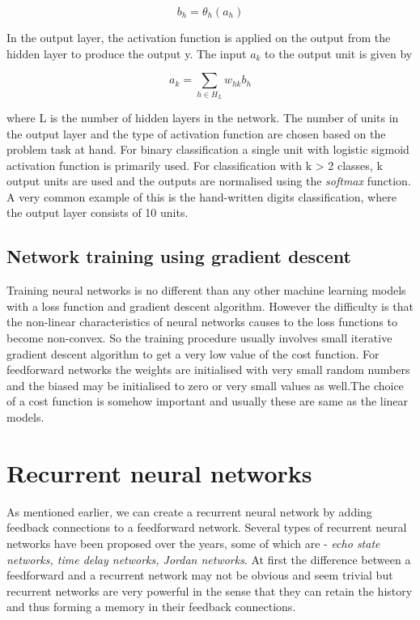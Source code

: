     \begin{equation}
        b_{h} = \theta_{h}(a_{h})
    \end{equation}

In the output layer, the activation function is applied on the output from the hidden layer to
produce the output y. The input $a_{k}$ to the output unit is given by

    \begin{equation}
        a_{k} = \displaystyle\sum_{h \in H_{L}} w_{hk}b_{h}
    \end{equation}

where L is the number of hidden layers in the network. The number of units in the output layer
and the type of activation function are chosen based on the problem task at hand. For binary
classification a single unit with logistic sigmoid activation function is primarily used. For
classification with k > 2 classes, k output units are used and the outputs are normalised using
the \emph{softmax} function. A very common example of this is the hand-written digits classification,
where the output layer consists of 10 units.

\subsection {Network training using gradient descent}
Training neural networks is no different than any other machine learning models with a loss
function and gradient descent algorithm. However the difficulty is that the non-linear
characteristics of neural networks causes to the loss functions to become non-convex. So the
training procedure usually involves small iterative gradient descent algorithm to get a very low
value of the cost function. For feedforward networks the weights are initialised with very small
random numbers and the biased may be initialised to zero or very small values as well.The choice
of a cost function is somehow important and usually these are same as the linear models.

\section{Recurrent neural networks}
As mentioned earlier, we can create a recurrent neural network by adding feedback connections to
a feedforward network. Several types of recurrent neural networks have been proposed over the
years, some of which are - \emph{echo state networks, time delay networks, Jordan networks}. At
first the difference between a feedforward and a recurrent network may not be obvious and seem
trivial but recurrent networks are very powerful in the sense that they can retain the history and
thus forming a memory in their feedback connections.


